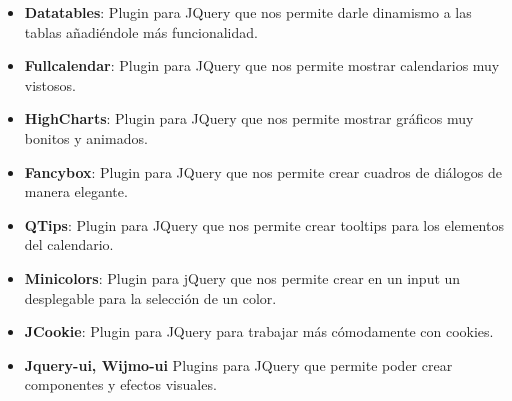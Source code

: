 \begin{itemize}
\item \textbf{Datatables}: Plugin para JQuery que nos permite darle dinamismo a las tablas añadiéndole más funcionalidad.
\item \textbf{Fullcalendar}: Plugin para JQuery que nos permite mostrar calendarios muy vistosos.
\item \textbf{HighCharts}: Plugin para JQuery que nos permite mostrar gráficos muy bonitos y animados.
\item \textbf{Fancybox}: Plugin para JQuery que nos permite crear cuadros de diálogos de manera elegante.
\item \textbf{QTips}: Plugin para JQuery que nos permite crear tooltips para los elementos del calendario.
\item \textbf{Minicolors}: Plugin para jQuery que nos permite crear en un input un desplegable para la selección de un color.
\item \textbf{JCookie}: Plugin para JQuery para trabajar más cómodamente con cookies.
\item \textbf{Jquery-ui, Wijmo-ui} Plugins para JQuery que permite poder crear componentes y efectos visuales.
\end{itemize}